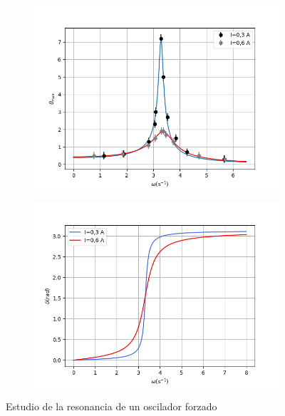 \documentclass[a4paper,12pt,titlepage]{article}
\begin{document}
\begin{figure}[h!]
    \centering
    \begin{subfigure}{0.49\textwidth}
        \centering
        \includegraphics[width=0.95\linewidth]{Images/A(omega).png}
    \end{subfigure}
    \begin{subfigure}{0.49\textwidth}
        \centering
        \includegraphics[width=0.95\linewidth]{Images/desfase.png}
    \end{subfigure}
    \caption{Estudio de la resonancia de un oscilador forzado}
    \label{forzado}
\end{figure}
\end{document}
